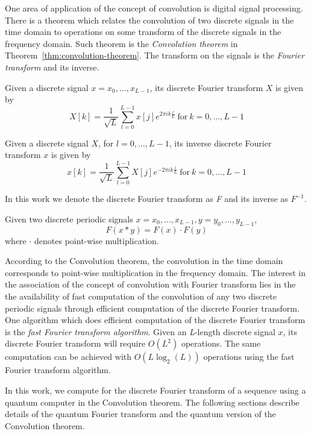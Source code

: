 One area of application of the concept of convolution is digital signal processing. There is a theorem which relates the convolution of two discrete signals in the time domain to operations on some transform of the discrete signals in the frequency domain. Such theorem is the \textit{Convolution theorem} in Theorem~\ref{thm:convolution-theorem}. The transform on the signals is the \textit{Fourier transform} and its inverse.

\begin{definition}
	Given a discrete signal $x=x_0,\ldots,x_{L-1}$, its discrete Fourier transform $X$ is given by
	\[
		X[k] = \frac{1}{\sqrt{L}} \sum_{l=0}^{L-1} x[j] e^{2\pi i k \frac{l}{L}}\ \text{for}\ k=0,\ldots,L-1
	\]
\end{definition}
\begin{definition}
	Given a discrete signal $X$, for $l=0,\ldots,L-1$, its inverse discrete Fourier transform $x$ is given by
	\[
		x[k] = \frac{1}{\sqrt{L}} \sum_{l=0}^{L-1} X[j] e^{-2\pi i k \frac{l}{L}}\ \text{for}\ k=0,\ldots,L-1
	\]
\end{definition}
In this work we denote the discrete Fourier transform as \textit{F} and its inverse as $F^{-1}$.

\begin{theorem}\label{thm:convolution-theorem}
	Given two discrete periodic signals $x=x_0,\ldots,x_{L-1}, y=y_0,\ldots,y_{L-1}$,
	\[
		F\left( x \ast y \right) = F\left( x \right) \cdot F\left( y \right)
	\]
where $\cdot$ denotes point-wise multiplication.
\end{theorem}

According to the Convolution theorem, the convolution in the time domain corresponds to point-wise multiplication in the frequency domain. The interest in the association of the concept of convolution with Fourier transform lies in the the availability of fast computation of the convolution of any two discrete periodic signals through efficient computation of the discrete Fourier transform. One algorithm which does efficient computation of the discrete Fourier transform is the \textit{fast Fourier transform algorithm}. Given an \textit{L}-length discrete signal $x$, its discrete Fourier transform will require $O(L^2)$ operations. The same computation can be achieved with $O(L\log_2(L))$ operations using the fast Fourier transform algorithm.

In this work, we compute for the discrete Fourier transform of a sequence using a quantum computer in the Convolution theorem. The following sections describe details of the quantum Fourier transform and the quantum version of the Convolution theorem. 

